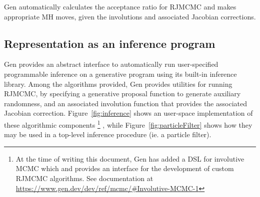 Gen automatically calculates the acceptance ratio for RJMCMC and makes appropriate MH moves, given the involutions and associated Jacobian corrections.

\subsection{Representation as an inference program}
Gen provides an abstract interface to automatically run user-specified programmable inference on a generative program using its built-in inference library.
Among the algorithms provided, Gen provides utilities for running RJMCMC, by specifying a generative proposal function to generate auxiliary randomness, and an associated involution function that provides the associated Jacobian correction.
Figure~\ref{fig:inference} shows an user-space implementation of these algorithmic components
\footnote{
  At the time of writing this document, Gen has added a DSL for involutive MCMC which and provides an interface for the development of custom RJMCMC algorithms.
  See documentation at \url{https://www.gen.dev/dev/ref/mcmc/\#Involutive-MCMC-1}
}
, while Figure~\ref{fig:particleFilter} shows how they may be used in a top-level inference procedure (ie. a particle filter).


\lstset{language=julia}
\lstset{style=Gen}

